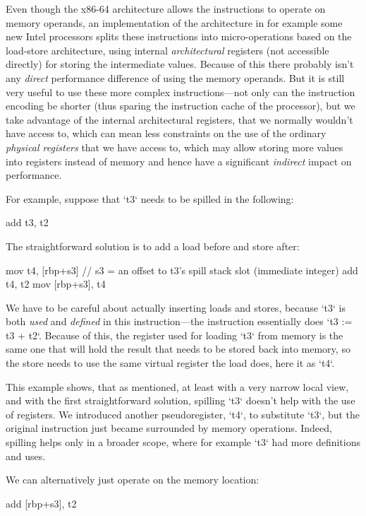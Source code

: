 Even though the x86-64 architecture allows
the instructions to operate on memory operands, an implementation of the
architecture in for example some new Intel processors splits these instructions
into micro-operations based on the load-store architecture, using internal
{\em architectural} registers (not accessible directly) for storing the
intermediate values. Because of this there probably isn't any {\em direct}
performance difference of using the memory operands. But it is still very useful
to use these more complex instructions---not only can the instruction encoding
be shorter (thus sparing the instruction cache of the processor), but we take
advantage of the internal architectural registers, that we normally wouldn't
have access to, which can mean less constraints on the use of the ordinary
{\em physical registers} that we have access to, which may allow storing more
values into registers instead of memory and hence have a significant {\em
indirect} impact on performance.

For example, suppose that `t3` needs to be spilled in the following:

\begtt
add t3, t2
\endtt

The straightforward solution is to add a load before and store after:

\begtt
mov t4, [rbp+s3] // s3 = an offset to t3's spill stack slot (immediate integer)
add t4, t2
mov [rbp+s3], t4
\endtt

We have to be careful about actually inserting loads and stores, because `t3` is
both {\em used} and {\em defined} in this instruction---the instruction
essentially does `t3 := t3 + t2`. Because of this, the register used for loading
`t3` from memory is the same one that will hold the result that needs to be
stored back into memory, so the store needs to use the same virtual register
the load does, here it as `t4`.

This example shows, that as mentioned, at least with a very narrow local
view, and with the first straightforward solution, spilling `t3` doesn't help with the
use of registers. We introduced another pseudoregister, `t4`, to substitute
`t3`, but the original instruction just became surrounded by memory operations.
Indeed, spilling helps only in a broader scope, where for example `t3` had more
definitions and uses.

We can alternatively just operate on the memory location:

\begtt
add [rbp+s3], t2
\endtt

